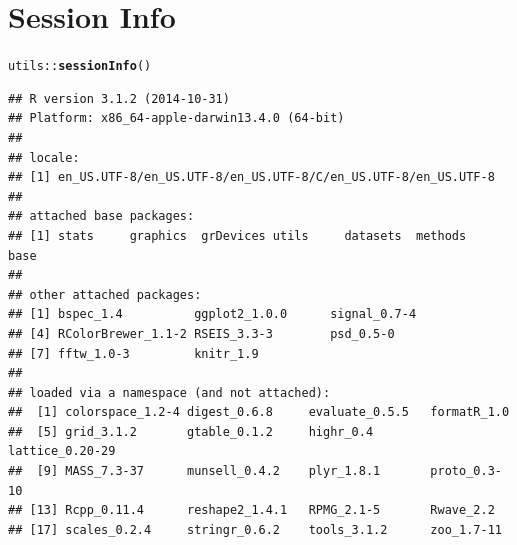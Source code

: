 \documentclass[10pt]{article}\usepackage[]{graphicx}\usepackage[]{color}
\makeatletter
\newcommand{\hlopt}[1]{\textcolor[rgb]{0,0,0}{#1}}%
\newcommand{\hlstd}[1]{\textcolor[rgb]{0.345,0.345,0.345}{#1}}%
\newcommand{\hlkwd}[1]{\textcolor[rgb]{0.737,0.353,0.396}{\textbf{#1}}}%
\newenvironment{kframe}{%
 \def\at@end@of@kframe{}%
 \ifinner\ifhmode%
  \def\at@end@of@kframe{\end{minipage}}%
  \begin{minipage}{\columnwidth}%
 \fi\fi%
 \def\FrameCommand##1{\hskip\@totalleftmargin \hskip-\fboxsep
 \colorbox{shadecolor}{##1}\hskip-\fboxsep
     \hskip-\linewidth \hskip-\@totalleftmargin \hskip\columnwidth}%
 \MakeFramed {\advance\hsize-\width
   \@totalleftmargin\z@ \linewidth\hsize
   \@setminipage}}%
 {\par\unskip\endMakeFramed%
 \at@end@of@kframe}
\newenvironment{knitrout}{}{} %
\makeatother
\begin{document}
\section*{Session Info}
\begin{knitrout}
\color{fgcolor}\begin{kframe}
\begin{alltt}
\hlstd{utils}\hlopt{::}\hlkwd{sessionInfo}\hlstd{()}
\end{alltt}
\begin{verbatim}
## R version 3.1.2 (2014-10-31)
## Platform: x86_64-apple-darwin13.4.0 (64-bit)
## 
## locale:
## [1] en_US.UTF-8/en_US.UTF-8/en_US.UTF-8/C/en_US.UTF-8/en_US.UTF-8
## 
## attached base packages:
## [1] stats     graphics  grDevices utils     datasets  methods   base     
## 
## other attached packages:
## [1] bspec_1.4          ggplot2_1.0.0      signal_0.7-4      
## [4] RColorBrewer_1.1-2 RSEIS_3.3-3        psd_0.5-0         
## [7] fftw_1.0-3         knitr_1.9         
## 
## loaded via a namespace (and not attached):
##  [1] colorspace_1.2-4 digest_0.6.8     evaluate_0.5.5   formatR_1.0     
##  [5] grid_3.1.2       gtable_0.1.2     highr_0.4        lattice_0.20-29 
##  [9] MASS_7.3-37      munsell_0.4.2    plyr_1.8.1       proto_0.3-10    
## [13] Rcpp_0.11.4      reshape2_1.4.1   RPMG_2.1-5       Rwave_2.2       
## [17] scales_0.2.4     stringr_0.6.2    tools_3.1.2      zoo_1.7-11
\end{verbatim}
\end{kframe}
\end{knitrout}


\end{document}
